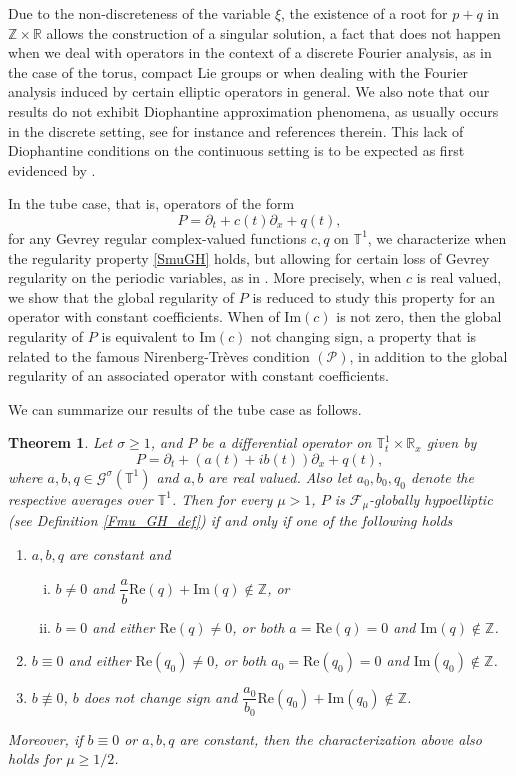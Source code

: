 \documentclass[11pt,reqno]{amsart}
\newtheorem{theorem}{Theorem}[section]
\numberwithin{equation}{section}
\theoremstyle{definition}
\theoremstyle{definition}
\newcommand{\T}{\mathbb{T}}
\newcommand{\R}{\mathbb{R}}
\newcommand{\Z}{\mathbb{Z}}
\newcommand{\Real}{\mathrm{Re}}
\newcommand{\Imag}{\mathrm{Im}}
\begin{document}
 Due to the non-discreteness of the variable $\xi$, the existence of a root for $p+q$ in $\Z\times \R$ allows the construction of a singular solution, a fact that does not happen when we deal with operators in the context of a discrete Fourier analysis, as in the case of the torus, compact Lie groups or when dealing with the Fourier analysis induced by certain elliptic operators in general. We also note that our results do not exhibit Diophantine approximation phenomena, as usually occurs in the discrete setting, see for instance \cite{AKM19,Ber1994,Ber1999,BCM1993,AGK2018,GW,Hounie,KMR2021} and references therein. This lack of Diophantine conditions  
 on the continuous setting is to be expected as  first evidenced by \cite{Hounie}.
 
 In the tube case, that is, operators of the form
\[P=\partial_t+c(t)\partial_x+q(t),\]
for any Gevrey regular complex-valued functions $c,q$ on $\T^1$, we characterize when the regularity property \eqref{SmuGH} holds, but allowing for certain loss of Gevrey regularity on the periodic variables, as in \cite{AvCap2022}. More precisely, when $c$ is real valued, we show that the global regularity of $P$ is reduced to study this property for an operator with constant coefficients. When of $\Imag(c)$ is not zero, then the global regularity of $P$ is equivalent to $\Imag(c)$ not changing sign, a property that is related to the famous Nirenberg-Tr\`eves condition $(\mathcal{P})$, in addition to the global regularity of an associated operator with constant coefficients.

 We can summarize our results of the tube case as follows.
 \begin{theorem}
     Let $\sigma\ge 1$, and $P$ be a differential operator on $\T^1_t\times \R_x$ given by 
     \begin{equation*}
         P=\partial_t+(a(t)+ib(t))\partial_x+q(t),
     \end{equation*}
     where $a,b,q\in\mathscr{G}^\sigma(\T^1)$ and $a,b$ are real valued. Also let $a_0,b_0,q_0$ denote the respective averages over $\T^1$. Then for every $\mu> 1$,  $P$ is $\mathscr{F}_\mu$-globally hypoelliptic (see Definition \ref{Fmu_GH_def}) if and only if one of the following holds
     \begin{enumerate}
         \item $a,b,q$ are constant and \begin{enumerate}[i)]
             \item $b\neq 0$ and $\dfrac{a}{b}\Real(q)+\Imag(q)\not\in\Z$, or
             \item $b=0$ and either $\Real(q)\neq 0$, or both   $a=\Real(q)=0$ and $\Imag(q)\not\in\Z$.
         \end{enumerate}
         \item $b\equiv0$ and either $\Real(q_0)\neq 0$, or both $a_0=\Real(q_0)=0$ and $\Imag(q_0)\not\in\Z$.
         \item $b\not\equiv0$, $b$ does not change sign and $\dfrac{a_0}{b_0}\Real(q_0)+\Imag(q_0)\not\in\Z$.
       \end{enumerate}
       Moreover, if $b\equiv0$ or $a,b,q$ are constant, then the characterization above also holds for $\mu\geq 1/2$.
 \end{theorem}
\end{document}
